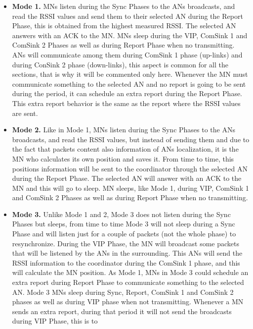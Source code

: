 \begin{itemize}
 \item \textbf{Mode 1.} \acp{MN} listen during the Sync Phases to the \acp{AN} broadcasts, and read the \ac{RSSI} values and send them
to their selected \ac{AN} during the Report Phase, this is obtained from the highest measured \ac{RSSI}. The selected \ac{AN} answers with an \ac{ACK} 
to the \ac{MN}. \acp{MN} sleep during the \ac{VIP}, ComSink 1 and ComSink 2 Phases as well as during Report Phase when no transmitting. 
\acp{AN} will communicate among them during ComSink 1 phase (up-links) and during ConSink 2 phase (down-links), this aspect is common for all the 
sections, that is why it will be commented only here. Whenever the \ac{MN} must communicate something to the selected \ac{AN} and no report is going to 
be sent during the period, it can schedule an extra report during the Report Phase. This extra report behavior is the same as the report where
the \ac{RSSI} values are sent.
 \item \textbf{Mode 2.} Like in Mode 1, \acp{MN} listen during the Sync Phases to the \acp{AN} broadcasts, and read the \ac{RSSI} values, but instead
of sending them and due to the fact that packets content also information of \acp{AN} localization, it is the \ac{MN} who calculates its own position 
and saves it. From time to time, this positions information will be sent to the 
coordinator through the selected \ac{AN} during the Report Phase. The selected \ac{AN} will answer with an \ac{ACK} to the \ac{MN} and this will go to
sleep. \ac{MN} sleeps, like Mode 1, during \ac{VIP}, ComSink 1 and ComSink 2 Phases as well as during Report Phase when no transmitting.
 \item \textbf{Mode 3.} Unlike Mode 1 and 2, Mode 3 does not listen during the Sync Phases but sleeps, from time to time Mode 3 will not sleep during a 
Sync Phase and will listen just for a couple of packets (not the whole phase) to resynchronize. During the \ac{VIP} Phase, the \ac{MN} will broadcast
some packets that will be listened by the \acp{AN} in the surrounding. This \acp{AN} will send the \ac{RSSI} information to the coordinator during the 
ComSink 1 phase, and this will calculate the \ac{MN} position. As Mode 1, \acp{MN} in Mode 3 could schedule an extra report during Report Phase to
communicate something to the selected \ac{AN}. Mode 3 \acp{MN} sleep during Sync, Report, ComSink 1 and ComSink 2 phases as well as during \ac{VIP} phase
when not transmitting. Whenever a \ac{MN} sends an extra report, during that period it will not send the broadcasts during \ac{VIP} Phase, this is to 

\end{itemize}
